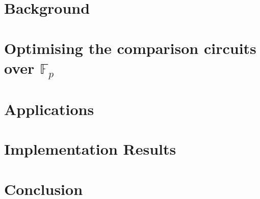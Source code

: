 \documentclass[USenglish,oneside,twocolumn]{article}
\theoremstyle{remark}
\begin{document}
\section{Background}
\label{sec:background}


% 

\section{Optimising the comparison circuits over $\mathbb{F}_p$}
\label{sec:comparison-circuit}



\section{Applications}
\label{sec:applications}


\section{Implementation Results}
\label{sec:impl-results}


% 

\section{Conclusion}





\appendix

\end{document}
